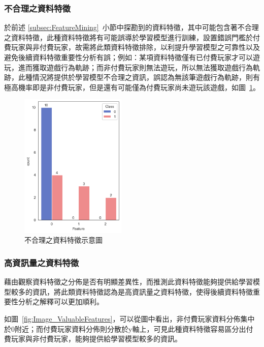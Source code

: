 \subsubsection{不合理之資料特徵}
\label{subsubsec:UnreasonableFeatures}

於前述 \ref{subsec:FeatureMining}~小節中探勘到的資料特徵，其中可能包含著不合理之資料特徵，此種資料特徵將有可能誤導於學習模型進行訓練，設置錯誤門檻於付費玩家與非付費玩家，故需將此類資料特徵排除，以利提升學習模型之可靠性以及避免後續資料特徵重要性分析有誤；例如：某項資料特徵僅有已付費玩家才可以遊玩，進而獲取遊戲行為軌跡；而非付費玩家則無法遊玩，所以無法獲取遊戲行為軌跡，此種情況將提供於學習模型不合理之資訊，誤認為無該筆遊戲行為軌跡，則有極高機率即是非付費玩家，但是還有可能僅為付費玩家尚未遊玩該遊戲，如圖~\ref{fig:UnreasonableFeatures}。

\begin{figure}[!htb]
  \begin{center}
    \includegraphics[width=0.45\textwidth]{figures/Image_UnreasonableFeatures.png}
    \caption[不合理之資料特徵示意圖]{不合理之資料特徵示意圖}
    \label{fig:UnreasonableFeatures}
  \end{center}
\end{figure}
\newpage

\subsubsection{高資訊量之資料特徵}
\label{subsubsec:ValuableFeatures}

藉由觀察資料特徵之分佈是否有明顯差異性，而推測此資料特徵能夠提供給學習模型較多的資訊，將此類資料特徵認為是高資訊量之資料特徵，使得後續資料特徵重要性分析之解釋可以更加順利。

如圖~\ref{fig:Image_ValuableFeatures}，可以從圖中看出，非付費玩家資料分佈集中於0附近；而付費玩家資料分佈則分散於y軸上，可見此種資料特徵容易區分出付費玩家與非付費玩家，能夠提供給學習模型較多的資訊。

